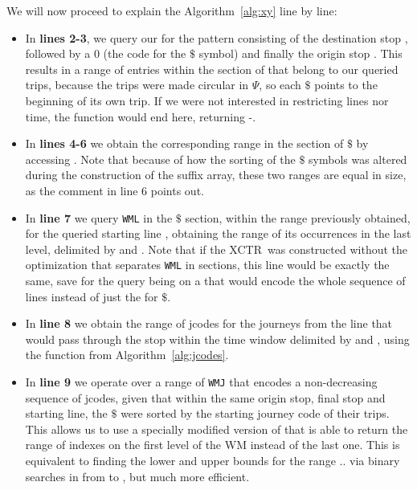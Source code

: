 \documentclass[runningheads]{llncs}
\newcommand{\ctr}{XCTR}
\begin{document}
We will now proceed to explain the Algorithm~\ref{alg:xy} line by line:
\begin{itemize}
    \item In \textbf{lines 2-3}, we query our  for the pattern consisting of the destination stop , followed by a 0 (the code for the $\$$ symbol) and finally the origin stop . This results in a range of entries within the section of  that belong to our queried trips, because the trips were made circular in $\Psi$, so each $\$$ points to the beginning of its own trip. If we were not interested in restricting lines nor time, the function would end here, returning -.
    
    \item In \textbf{lines 4-6} we obtain the corresponding range in the section of $\$$ by accessing \FuncSty{$\Psi$}. Note that because of how the sorting of the $\$$ symbols was altered during the construction of the suffix array, these two ranges are equal in size, as the comment in line 6 points out.
    
    \item In \textbf{line 7} we query \texttt{WML} in the $\$$ section, within the range previously obtained, for the queried starting line , obtaining the range of its occurrences in the last level, delimited by  and . Note that if the \ctr~was constructed without the optimization that separates \texttt{WML} in sections, this line would be exactly the same, save for the query being on a  that would encode the whole sequence of lines instead of just the  for $\$$.
    
    \item In \textbf{line 8} we obtain the range of jcodes for the journeys from the line  that would pass through the stop  within the time window delimited by  and , using the function  from Algorithm~\ref{alg:jcodes}.
    
    \item In \textbf{line 9} we operate over a range of \texttt{WMJ} that encodes a non-decreasing sequence of jcodes, given that within the same origin stop, final stop and starting line, the $\$$ were sorted by the starting journey code of their trips. This allows us to use a specially modified version of  that is able to return the range of indexes on the first level of the WM instead of the last one. This is equivalent to finding the lower and upper bounds for the range $..$ via binary searches in  from  to , but much more efficient.
    

\end{itemize}
\end{document}
